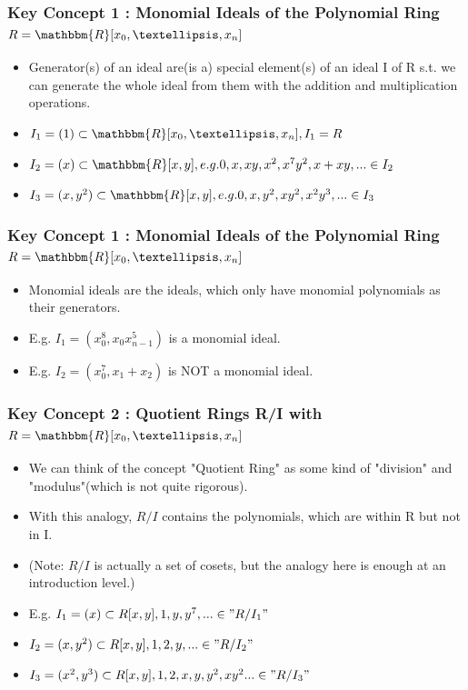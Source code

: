 \documentclass{beamer}
\begin{document}
\begin{frame}
\frametitle{Key Concept 1 : Monomial Ideals of the Polynomial Ring \(R = \mathbbm{R}[x_0, …, x_n]\)}
\begin{itemize}
	\item Generator(s) of an ideal are(is a) special element(s) of an ideal I of R s.t. we can generate the whole ideal from them with the addition and multiplication operations.
	\item \(I_1 = (1) \subset \mathbbm{R}[x_0, …, x_n], I_1 = R\)
	\item \(I_2 = (x) \subset \mathbbm{R}[x, y], e.g. 0, x, xy, x^2, x^7y^2, x + xy, ... \in I_2\)
	\item \(I_3 = (x, y^2) \subset \mathbbm{R}[x, y], e.g. 0, x, y^2, xy^2, x^2y^3,... \in I_3\)
\end{itemize}
\end{frame}

\begin{frame}
\frametitle{Key Concept 1 : Monomial Ideals of the Polynomial Ring \(R = \mathbbm{R}[x_0, …, x_n]\)}
\begin{itemize}
	\item Monomial ideals are the ideals, which only have monomial polynomials as their generators.
	\item E.g. \(I_1 = (x_0^8, x_0x_{n - 1}^5)\) is a monomial ideal.
	\item E.g. \(I_2 = (x_0^7, x_1 + x_2)\) is NOT a monomial ideal.
\end{itemize}
\end{frame}


\begin{frame}
\frametitle{Key Concept 2 : Quotient Rings R/I with \(R = \mathbbm{R}[x_0, …, x_n]\)}
\begin{itemize}
	\item We can think of the concept "Quotient Ring" as some kind of "division" and "modulus"(which is not quite rigorous).
	\item With this analogy, \(R/I\) contains the polynomials, which are within R but not in I.
	\item (Note: \(R/I\) is actually a set of cosets, but the analogy here is enough at an introduction level.)
	\item E.g. \(I_1 = (x) \subset R[x, y], 1, y, y^7, ... \in "R/I_1"\)
	\item \(I_2 = (x, y^2) \subset R[x, y], 1, 2, y, ... \in "R/I_2"\)
	\item \(I_3 = (x^2, y^3) \subset R[x, y], 1, 2, x, y, y^2, xy^2 ... \in "R/I_3"\)
\end{itemize}
\end{frame}
\end{document}
